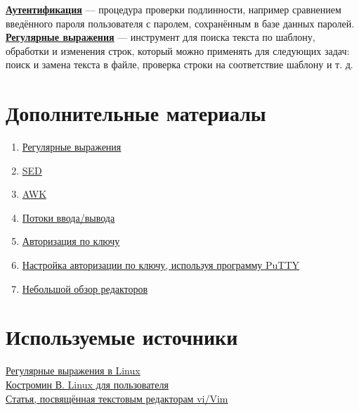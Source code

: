 \documentclass[14pt, a4paper]{article}
\begin{document}
\href{https://ru.wikipedia.org/wiki/Аутентификация}{\underline{\textbf{Аутентификация}}} — процедура проверки подлинности, например сравнением введённого пароля
пользователя с паролем, сохранённым в базе данных паролей.\\

\href{https://losst.pro/regulyarnye-vyrazheniya-linux}{\underline{\textbf{Регулярные выражения}}} — инструмент для поиска текста по шаблону, обработки и изменения строк,
который можно применять для следующих задач: поиск и замена текста в файле, проверка строки на
соответствие шаблону и т. д.

\section*{Дополнительные материалы} 

\begin{enumerate}
    \item \href{https://habr.com/ru/post/115825/}{Регулярные выражения}
    \item \href{http://rus-linux.net/MyLDP/consol/sed.html}{SED}
    \item \href{http://rus-linux.net/MyLDP/consol/awk.html}{AWK}
    \item \href{http://xgu.ru/wiki/Стандартные_потоки_ввода/вывода}{Потоки ввода/вывода}
    \item \href{https://losst.pro/avtorizatsiya-po-klyuchu-ssh}{Авторизация по ключу}
    \item \href{https://rtfm.co.ua/putty-nastrojka-avtorizacii-ssh-po-klyuchu/}{Настройка авторизации по ключу, используя программу PuTTY}
    \item \href{https://losst.pro/luchshie-tekstovye-redaktory-linux}{Небольшой обзор редакторов}
\end{enumerate}

\section*{Используемые источники} 

\href{https://losst.pro/regulyarnye-vyrazheniya-linux}{Регулярные выражения в Linux}\\

\noindent \href{https://www.linuxcenter.ru/lib/books/kostromin}{Костромин В. Linux для пользователя}\\

\noindent \href{https://help.ubuntu.ru/wiki/vim}{Статья, посвящённая текстовым редакторам vi/Vim}\\
\end{document}
